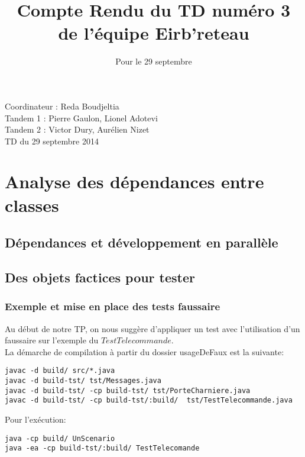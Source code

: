 \documentclass[a4paper,11pts]{article}
\begin{document}
\title{Compte Rendu du TD numéro 3 de l'équipe Eirb'reteau}
\date{Pour le 29 septembre}
\maketitle

\begin{center}
  Coordinateur : Reda Boudjeltia \\
  Tandem 1 : Pierre Gaulon, Lionel Adotevi\\
  Tandem 2 : Victor Dury,  Aurélien Nizet \\
  TD du 29 septembre 2014

\end{center}
\maketitle

\section{Analyse des dépendances entre classes}

\subsection{Dépendances et développement en parallèle}

\subsection{Des objets factices pour tester}

\subsubsection{Exemple et mise en place des tests faussaire}
Au début de notre TP, on nous suggère d'appliquer un test avec l'utilisation d'un faussaire sur l'exemple du $TestTelecommande$.   
\\
La démarche de compilation à partir du dossier usageDeFaux est la suivante:
\begin{verbatim}
javac -d build/ src/*.java 
javac -d build-tst/ tst/Messages.java
javac -d build-tst/ -cp build-tst/ tst/PorteCharniere.java 
javac -d build-tst/ -cp build-tst/:build/  tst/TestTelecommande.java
\end{verbatim}

Pour l'exécution:
\begin{verbatim}
java -cp build/ UnScenario
java -ea -cp build-tst/:build/ TestTelecomande
\end{verbatim}
\end{document}
